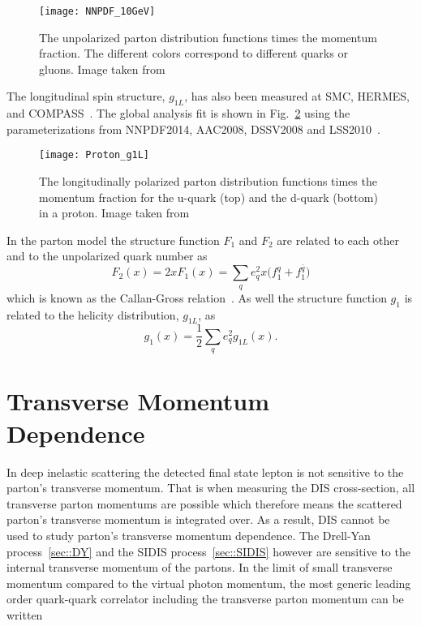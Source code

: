 \begin{figure}[h!t]
  \centering \texttt{[image: NNPDF\_10GeV]}
  \caption{The unpolarized parton distribution functions times the momentum
    fraction.  The different colors correspond to different quarks or gluons.
    Image taken from~\cite{Tanabashi:2018oca}}
  \label{fig::NNPDF_10GeV}
\end{figure}

The longitudinal spin structure, $g_{1L}$, has also been measured at SMC,
HERMES, and COMPASS~\cite{Adeva:1997is,PhysRevLett.92.012005,Savin:2011zz}.  The
global analysis fit is shown in Fig.~\ref{fig::Proton_g1L} using the
parameterizations from NNPDF2014, AAC2008, DSSV2008 and
LSS2010~\cite{Harland-Lang:2016yfn,Abt:2016vjh,Nocera:2014gqa,Hirai:2008aj}.

\begin{figure}[h!t]
  \centering \texttt{[image: Proton\_g1L]}
  \caption{The longitudinally polarized parton distribution functions times the
    momentum fraction for the u-quark (top) and the d-quark (bottom) in a
    proton.  Image taken from~\cite{Tanabashi:2018oca}}
  \label{fig::Proton_g1L}
\end{figure}

In the parton model the structure function $F_1$ and $F_2$ are related to each
other and to the unpolarized quark number as
\begin{equation}
  F_2(x) = 2xF_1(x) = \sum_q e_q^2x\Big(f^q_1 + f^{\bar{q}}_1 \Big)
\end{equation}
which is known as the Callan-Gross relation~\cite{PhysRevLett.22.156}.  As well
the structure function $g_1$ is related to the helicity distribution, $g_{1L}$,
as
\begin{equation}
  g_1(x) = \frac{1}{2} \sum_q e^2_q g_{1L}(x).
  \label{equ::g1_g1l_relation}
\end{equation}


\section{Transverse Momentum Dependence}
In deep inelastic scattering the detected final state lepton is not sensitive to
the parton's transverse momentum.  That is when measuring the DIS
cross-section, all transverse parton momentums are possible which therefore
means the scattered parton's transverse momentum is integrated over.  As a
result, DIS cannot be used to study parton's transverse momentum dependence.
The Drell-Yan process~\ref{sec::DY} and the SIDIS process~\ref{sec::SIDIS}
however are sensitive to the internal transverse momentum of the partons.  In
the limit of small transverse momentum compared to the virtual photon momentum,
the most generic leading order quark-quark correlator including the transverse
parton momentum can be
written~\cite{Mulders:1995dh,Boer:1997nt,Bacchetta:2006tn}

